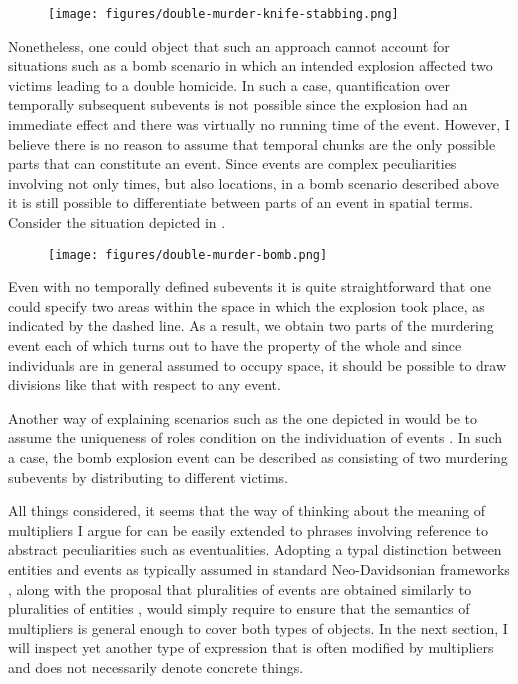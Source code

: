 \begin{figure}[h!]
\centering
\texttt{[image: figures/double-murder-knife-stabbing.png]}
\label{fig:parts-of-a-double-murder-event-in-a-knife-stabbing-scenario}
\end{figure}

Nonetheless, one could object that such an approach cannot account for situations such as a bomb scenario in which an intended explosion affected two victims leading to a double homicide. In such a case, quantification over temporally subsequent subevents is not possible since the explosion had an immediate effect and there was virtually no running time of the event. However, I believe there is no reason to assume that temporal chunks are the only possible parts that can constitute an event. Since events are complex peculiarities involving not only times, but also locations, in a bomb scenario described above it is still possible to differentiate between parts of an event in spatial terms. Consider the situation depicted in . 

\begin{figure}[h!]
\centering
\texttt{[image: figures/double-murder-bomb.png]}
\label{fig:parts-of-a-double-murder-event-in-a-bomb-scenario}
\end{figure}

Even with no temporally defined subevents it is quite straightforward that one could specify two areas within the space in which the explosion took place, as indicated by the dashed line. As a result, we obtain two parts of the murdering event each of which turns out to have the property of the whole and since individuals are in general assumed to occupy space, it should be possible to draw divisions like that with respect to any event.

Another way of explaining scenarios such as the one depicted in  would be to assume the uniqueness of roles condition on the individuation of events \citep[see][]{parsons1990events}. In such a case, the bomb explosion event can be described as consisting of two murdering subevents by distributing to different victims.

All things considered, it seems that the way of thinking about the meaning of multipliers I argue for can be easily extended to phrases involving reference to abstract peculiarities such as eventualities. Adopting a typal distinction between entities and events as typically assumed in standard Neo-Davidsonian frameworks \citep[e.g.,][]{carlson1984thematic,dowty1989semantic,parsons1990events}, along with the proposal that pluralities of events are obtained similarly to pluralities of entities \citep{bach1986algebra}, would simply require to ensure that the semantics of multipliers is general enough to cover both types of objects. In the next section, I will inspect yet another type of expression that is often modified by multipliers and does not necessarily denote concrete things. 

